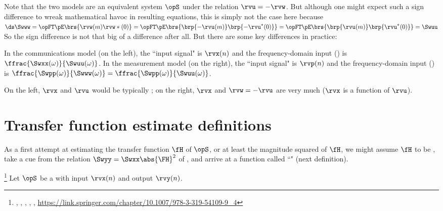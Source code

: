 Note that the two models are an equivalent system $\opS$ under the relation $\rvu=-\rvw$.
But although one might expect such a sign difference to wreak mathematical havoc in resulting equations,
this is simply not the case here because
\\\indentx$\ds\Swww = \opFT\pE\brs{\rvw(m)\rvw\ast(0)}
                    = \opFT\pE\brs{\brp{-\rvu(m)}\brp{-\rvu^\ast(0)}}
                    = \opFT\pE\brs{\brp{\rvu(m)}\brp{\rvu^\ast(0)}}
                    = \Swuu$
\\
So the sign difference is not that big of a difference after all.
But there are some key differences in practice:
\begin{liste}
  \item In the communications model (on the left), the ``input signal" is $\rvx(n)$
      and the frequency-domain input  () is $\ffrac{\Swxx(\omega)}{\Swuu(\omega)}$.
      In the measurement model (on the right), the ``input signal" is $\rvp(n)$
      and the frequency-domain input  () is 
         $\ffrac{\Swpp(\omega)}{\Swww(\omega)} = \ffrac{\Swpp(\omega)}{\Swuu(\omega)}$.

  \item On the left, $\rvx$ and $\rvu$ would be typically ;
        on the right, $\rvx$ and $\rvw=-\rvu$ are very much  ($\rvx$ is a function of $\rvu$).
\end{liste}

\section{Transfer function estimate definitions}
As a first attempt at estimating the transfer function $\fH$ of $\opS$,
or at least the magnitude squared of $\fH$,
we might assume $\fH$ to be , take a cue from the relation
$\Swyy=\Swxx\abs{\FH}^2$ of ,
and arrive at a function called ``"
(next definition).
\begin{definition}
\footnote{
  ,
  ,
  ,
  ,
  ,
  \url{https://link.springer.com/chapter/10.1007/978-3-319-54109-9_4}
  }
\label{def:Txy}
Let $\opS$ be a  with input $\rvx(n)$ and output $\rvy(n)$.
\end{definition}

